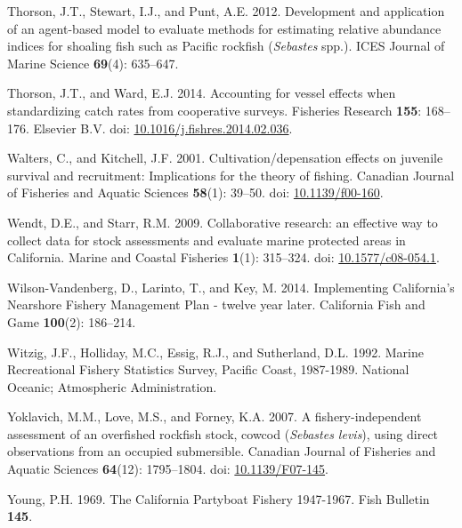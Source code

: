 \documentclass[
  english,
  a4paper,
]{article}
\newlength{\cslhangindent}
\newlength{\cslentryspacingunit} %
\newenvironment{CSLReferences}[2] %
 {%
  \setlength{\parindent}{0pt}
  \ifodd #1
  \let\oldpar\par
  \def\par{\hangindent=\cslhangindent\oldpar}
  \fi
  \setlength{\parskip}{#2\cslentryspacingunit}
 }%
 {}
\begin{document}
\begin{CSLReferences}{1}{0}
\leavevmode{}%
Thorson, J.T., Stewart, I.J., and Punt, A.E. 2012. {Development and application of an agent-based model to evaluate methods for estimating relative abundance indices for shoaling fish such as Pacific rockfish (\emph{Sebastes} spp.)}. ICES Journal of Marine Science \textbf{69}(4): 635--647.

\leavevmode{}%
Thorson, J.T., and Ward, E.J. 2014. {Accounting for vessel effects when standardizing catch rates from cooperative surveys}. Fisheries Research \textbf{155}: 168--176. Elsevier B.V. doi: \href{https://doi.org/10.1016/j.fishres.2014.02.036}{10.1016/j.fishres.2014.02.036}.

\leavevmode{}%
Walters, C., and Kitchell, J.F. 2001. {Cultivation/depensation effects on juvenile survival and recruitment: Implications for the theory of fishing}. Canadian Journal of Fisheries and Aquatic Sciences \textbf{58}(1): 39--50. doi: \href{https://doi.org/10.1139/f00-160}{10.1139/f00-160}.

\leavevmode{}%
Wendt, D.E., and Starr, R.M. 2009. {Collaborative research: an effective way to collect data for stock assessments and evaluate marine protected areas in California}. Marine and Coastal Fisheries \textbf{1}(1): 315--324. doi: \href{https://doi.org/10.1577/c08-054.1}{10.1577/c08-054.1}.

\leavevmode{}%
Wilson-Vandenberg, D., Larinto, T., and Key, M. 2014. {Implementing California's Nearshore Fishery Management Plan - twelve year later}. California Fish and Game \textbf{100}(2): 186--214.

\leavevmode{}%
Witzig, J.F., Holliday, M.C., Essig, R.J., and Sutherland, D.L. 1992. {Marine Recreational Fishery Statistics Survey, Pacific Coast, 1987-1989}. National Oceanic; Atmospheric Administration.

\leavevmode{}%
Yoklavich, M.M., Love, M.S., and Forney, K.A. 2007. {A fishery-independent assessment of an overfished rockfish stock, cowcod (\emph{Sebastes levis}), using direct observations from an occupied submersible}. Canadian Journal of Fisheries and Aquatic Sciences \textbf{64}(12): 1795--1804. doi: \href{https://doi.org/10.1139/F07-145}{10.1139/F07-145}.

\leavevmode{}%
Young, P.H. 1969. {The California Partyboat Fishery 1947-1967}. Fish Bulletin \textbf{145}.

\end{CSLReferences}
\end{document}
